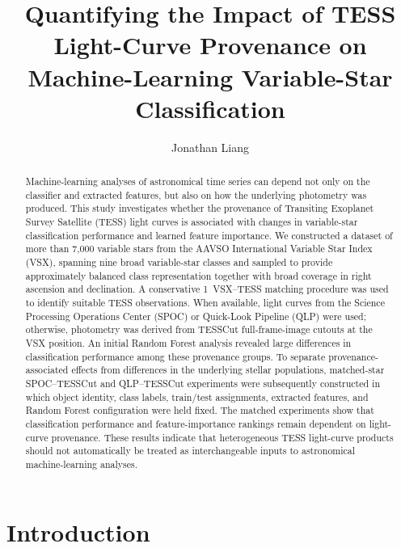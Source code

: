 \documentclass[linenumbers]{aastex701}
\begin{document}
\title{Quantifying the Impact of TESS Light-Curve Provenance on Machine-Learning Variable-Star Classification}
\author{Jonathan Liang}

\begin{abstract}
Machine-learning analyses of astronomical time series can depend not only on the classifier and extracted features, but also on how the underlying photometry was produced. This study investigates whether the provenance of Transiting Exoplanet Survey Satellite (TESS) light curves is associated with changes in variable-star classification performance and learned feature importance. We constructed a dataset of more than 7,000 variable stars from the AAVSO International Variable Star Index (VSX), spanning nine broad variable-star classes and sampled to provide approximately balanced class representation together with broad coverage in right ascension and declination. A conservative 1\arcsec\ VSX--TESS matching procedure was used to identify suitable TESS observations. When available, light curves from the Science Processing Operations Center (SPOC) or Quick-Look Pipeline (QLP) were used; otherwise, photometry was derived from TESSCut full-frame-image cutouts at the VSX position. An initial Random Forest analysis revealed large differences in classification performance among these provenance groups. To separate provenance-associated effects from differences in the underlying stellar populations, matched-star SPOC--TESSCut and QLP--TESSCut experiments were subsequently constructed in which object identity, class labels, train/test assignments, extracted features, and Random Forest configuration were held fixed. The matched experiments show that classification performance and feature-importance rankings remain dependent on light-curve provenance. These results indicate that heterogeneous TESS light-curve products should not automatically be treated as interchangeable inputs to astronomical machine-learning analyses.
\end{abstract}


\section{Introduction}
\label{sec:introduction}
\end{document}
